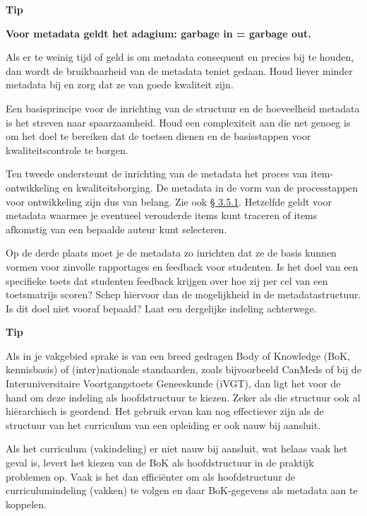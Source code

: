 \documentclass[
]{book}
\begin{document}
\textbf{Tip}

\textbf{Voor metadata geldt het adagium: garbage in = garbage out.}

Als er te weinig tijd of geld is om metadata consequent en precies bij te houden, dan wordt de bruikbaarheid van de metadata teniet gedaan. Houd liever minder metadata bij en zorg dat ze van goede kwaliteit zijn.

Een basisprincipe voor de inrichting van de structuur en de hoeveelheid metadata is het streven naar spaarzaamheid. Houd een complexiteit aan die net genoeg is om het doel te bereiken dat de toetsen dienen en de basisstappen voor kwaliteitscontrole te borgen.

Ten tweede ondersteunt de inrichting van de metadata het proces van item- ontwikkeling en kwaliteitsborging. De metadata in de vorm van de processtappen voor ontwikkeling zijn dus van belang. Zie ook \protect\hyperlink{componenten-en-processtappen}{§ 3.5.1}. Hetzelfde geldt voor metadata waarmee je eventueel verouderde items kunt traceren of items afkomstig van een bepaalde auteur kunt selecteren.

Op de derde plaats moet je de metadata zo inrichten dat ze de basis kunnen vormen voor zinvolle rapportages en feedback voor studenten. Is het doel van een specifieke toets dat studenten feedback krijgen over hoe zij per cel van een toetsmatrijs scoren? Schep hiervoor dan de mogelijkheid in de metadatastructuur. Is dit doel niet vooraf bepaald? Laat een dergelijke indeling achterwege.

\textbf{Tip}

Als in je vakgebied sprake is van een breed gedragen Body of Knowledge (BoK, kennisbasis) of (inter)nationale standaarden, zoals bijvoorbeeld CanMeds of bij de Interuniversitaire Voortgangstoets Geneeskunde (iVGT), dan ligt het voor de hand om deze indeling als hoofdstructuur te kiezen. Zeker als die structuur ook al hiërarchisch is geordend. Het gebruik ervan kan nog effectiever zijn als de structuur van het curriculum van een opleiding er ook nauw bij aansluit.

Als het curriculum (vakindeling) er niet nauw bij aansluit, wat helaas vaak het geval is, levert het kiezen van de BoK als hoofdstructuur in de praktijk problemen op. Vaak is het dan efficiënter om als hoofdstructuur de curriculumindeling (vakken) te volgen en daar BoK-gegevens als metadata aan te koppelen.
\end{document}
